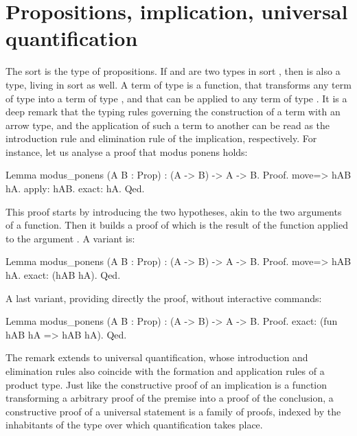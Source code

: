 \section{Propositions, implication, universal quantification}\label{sec:propiuq}

The sort  is the type of propositions. If  and  are
two types in sort , then  is also a type, living in
sort  as well. A term of type  is a function, that
transforms any term of type  into a term of type , and that
can be applied to any term of type . It is a deep remark that the
typing rules governing the construction of a term with an arrow type,
and the application of such a term to another can be read as the
introduction rule and elimination rule of the implication,
respectively. For instance, let us analyse a proof that modus ponens holds:

\begin{coq}{}{}
Lemma modus_ponens (A B : Prop) : (A -> B) -> A -> B.
Proof.
move=> hAB hA.
apply: hAB.
exact: hA.
Qed.
\end{coq}

This proof starts by introducing the two hypotheses, 
akin to the two arguments of a function. Then it builds a proof of 
 which is the result of the function  applied to the argument .
A variant is:

\begin{coq}{}{}
Lemma modus_ponens (A B : Prop) : (A -> B) -> A -> B.
Proof.
move=> hAB hA.
exact: (hAB hA).
Qed.
\end{coq}

A last variant, providing directly the proof, without interactive commands:

\begin{coq}{}{}
Lemma modus_ponens (A B : Prop) : (A -> B) -> A -> B.
Proof.
exact: (fun hAB hA => hAB hA).
Qed.
\end{coq}

The remark extends to universal quantification, whose introduction and
elimination rules also coincide with the formation and application
rules of a product type. Just like the constructive proof of an
implication is a function transforming a arbitrary proof of the
premise into a proof of the conclusion, a constructive proof of a
universal statement is a family of proofs, indexed by the inhabitants
of the type over which quantification takes place.




